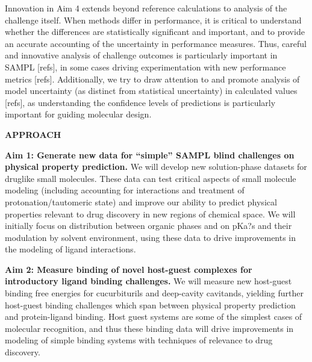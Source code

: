 \documentclass[11pt]{article}
\begin{document}
Innovation in Aim 4 extends beyond reference calculations to analysis of the challenge itself.
When methods differ in performance, it is critical to understand whether the differences are statistically significant and important, and to provide an accurate accounting of the uncertainty in performance measures. 
Thus, careful and innovative analysis of challenge outcomes is particularly important in SAMPL [refs], in some cases driving experimentation with new performance metrics [refs].
Additionally, we try to draw attention to and promote analysis of model uncertainty (as distinct from statistical uncertainty) in calculated values [refs], as understanding the confidence levels of predictions is particularly important for guiding molecular design.


{\large \bf APPROACH}


{\bf Aim 1: Generate new data for ``simple'' SAMPL blind challenges on physical property prediction.}
We will develop new solution-phase datasets for druglike small molecules. These data can test critical aspects of small molecule modeling (including accounting for interactions and treatment of protonation/tautomeric state) and improve our ability to predict physical properties relevant to drug discovery in new regions of chemical space. We will initially focus on distribution between organic phases and on pKa?s and their modulation by solvent environment, using these data to drive improvements in the modeling of ligand interactions.


{\bf Aim 2: Measure binding of novel host-guest complexes for introductory ligand binding challenges.}
We will measure new host-guest binding free energies for cucurbiturils and deep-cavity cavitands, yielding further host-guest binding challenges which span between physical property prediction and protein-ligand binding. Host guest systems are some of the simplest cases of molecular recognition, and thus these binding data will drive improvements in modeling of simple binding systems with techniques of relevance to drug discovery.
\end{document}
